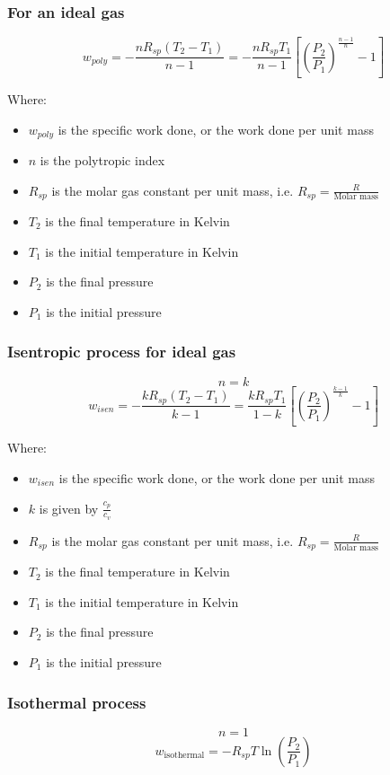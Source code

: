 \documentclass[11pt]{article}
\begin{document}
\subsubsection{For an ideal gas}
\label{sec:orgec6579e}
\[w_{poly} = - \frac{n R_{sp} (T_2 - T_1)}{n - 1} = - \frac{n R_{sp} T_1}{n - 1} \left[\left(\frac{P_2}{P_1} \right)^{\frac{n - 1}{n}} - 1 \right]\]

Where:
\begin{itemize}
\item \(w_{poly}\) is the specific work done, or the work done per unit mass
\item \(n\) is the polytropic index
\item \(R_{sp}\) is the molar gas constant per unit mass, i.e. \(R_{sp} = \frac{R}{\text{Molar mass}}\)
\item \(T_2\) is the final temperature in Kelvin
\item \(T_1\) is the initial temperature in Kelvin
\item \(P_2\) is the final pressure
\item \(P_1\) is the initial pressure
\end{itemize}

\subsubsection{Isentropic process for ideal gas}
\label{sec:org9589de4}
\[n = k\]
\[w_{isen} = - \frac{k R_{sp} (T_2 - T_1)}{k - 1} = \frac{k R_{sp} T_1}{1 - k} \left[\left(\frac{P_2}{P_1} \right)^{\frac{k - 1}{k}} - 1 \right]\]

Where:
\begin{itemize}
\item \(w_{isen}\) is the specific work done, or the work done per unit mass
\item \(k\) is given by \(\frac{c_p}{c_v}\)
\item \(R_{sp}\) is the molar gas constant per unit mass, i.e. \(R_{sp} = \frac{R}{\text{Molar mass}}\)
\item \(T_2\) is the final temperature in Kelvin
\item \(T_1\) is the initial temperature in Kelvin
\item \(P_2\) is the final pressure
\item \(P_1\) is the initial pressure
\end{itemize}

\subsubsection{Isothermal process}
\label{sec:org3f7fe65}
\[n = 1\]
\[w_{\text{isothermal}} = - R_{sp} T \ln \left(\frac{P_2}{P_1} \right)\]
\end{document}
